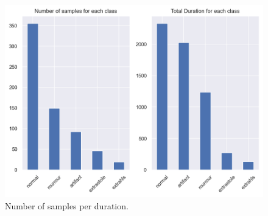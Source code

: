 \begin{figure}[H]
    \centering
    \includegraphics[width=1\columnwidth]{./images/DataExp_num_durations.png}
    \caption{Number of samples per duration.}
    \label{fig:DataExp_num_durations}
\end{figure}

